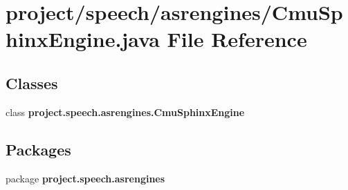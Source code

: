 \section{project/speech/asrengines/\+Cmu\+Sphinx\+Engine.java File Reference}
\label{_cmu_sphinx_engine_8java}
\subsection*{Classes}
\begin{DoxyCompactItemize}
\item 
class {\bf project.\+speech.\+asrengines.\+Cmu\+Sphinx\+Engine}
\end{DoxyCompactItemize}
\subsection*{Packages}
\begin{DoxyCompactItemize}
\item 
package {\bf project.\+speech.\+asrengines}
\end{DoxyCompactItemize}
